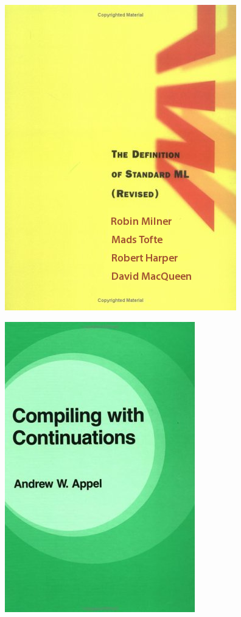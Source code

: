 \documentclass[14pt,t,usepdftitle=false,
xcolornames=x11names,svgnames,dvipsnames]{beamer}
\begin{document}
{
\begin{frame}
  \begin{center}
    \vspace*{-30mm}
    \includegraphics[scale=.72]{sml-book}
  \end{center}
\end{frame}

\begin{frame}
  \vspace*{-10mm}
  \begin{center}
    \includegraphics[scale=.72]{appel-book}
  \end{center}
\end{frame}
}
\end{document}

